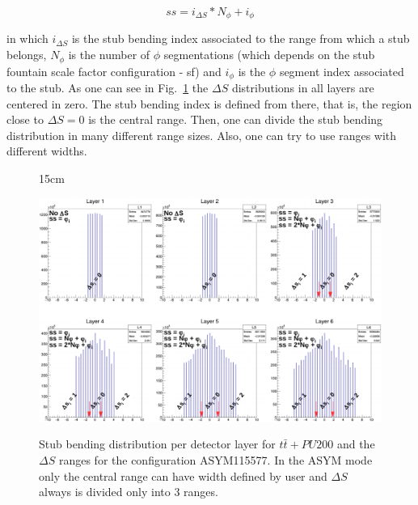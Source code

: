 \begin{equation}
ss = i_{\Delta S}*N_{\phi} + i_{\phi}
\end{equation}

in which $i_{\Delta S}$ is the stub bending index associated to the range from which a stub belongs, $N_{\phi}$ is the number of $\phi$ segmentations (which depends on the stub fountain scale factor configuration - sf) and $i_{\phi}$ is the $\phi$ segment index associated to the stub. As one can see in Fig.~\ref{fig:deltaS_ttbar_asym} the $\Delta S$ distributions in all layers are centered in zero. The stub bending index is defined from there, that is, the region close to $\Delta S = 0$ is the central range. Then, one can divide the stub bending distribution in many different range sizes. Also, one can try to use ranges with different widths. 

\begin{figure}[htbp]{15cm}
	\caption{Stub bending distribution per detector layer for $t\bar{t}+PU200$ and the $\Delta S$ ranges for the configuration ASYM115577. In the ASYM mode only the central range can have width defined by user and $\Delta S$ always is divided only into 3 ranges.}
	\centering
	\includegraphics[scale=0.8,angle=90]{AppendixCMSL1TT/figs/ttbar_pu200_asym115577}
	\label{fig:deltaS_ttbar_asym}
\end{figure}

